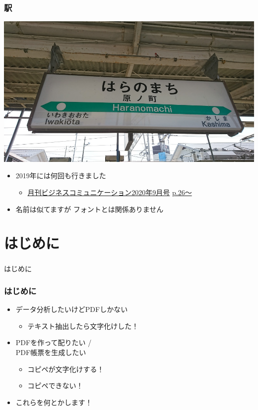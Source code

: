 \begin{frame}\frametitle{駅}
  \begin{center}
    \includegraphics[width=0.7\linewidth]{haranomachi.jpg}
  \end{center}

  \begin{itemize}
  \item \footnotesize 2019年には何回も行きました
    \begin{itemize}
    \item \tiny \href{https://www.bcm.co.jp/specials/2020/09/ev/}
      {月刊ビジネスコミュニケーション2020年9月号}%
      \href{https://www.bcm.co.jp/site/2020/09/ev/2009-ev-01-02.pdf}{p.26～}
    \end{itemize}
  \item \footnotesize 名前は似てますが
    フォントとは関係ありません
  \end{itemize}
\end{frame}

\section{はじめに}
\begin{frame}\frametitle{}
  \centering
  はじめに
\end{frame}

\begin{frame}\frametitle{はじめに}
  \begin{itemize}
  \item データ分析したいけどPDFしかない
    \begin{itemize}
    \item テキスト抽出したら文字化けした！
    \end{itemize}
  \item PDFを作って配りたい / \\ PDF帳票を生成したい
    \begin{itemize}
    \item コピペが文字化けする！
    \item コピペできない！
    \end{itemize}

    \vspace{1\zh}
  \item これらを何とかします！
  \end{itemize}
\end{frame}

